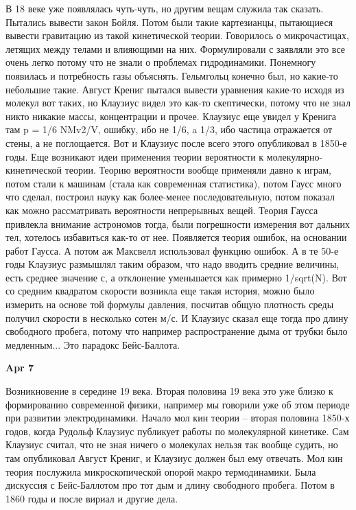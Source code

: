 \documentclass[a4paper, 12pt]{article}
\begin{document}
В 18 веке уже появлялась чуть-чуть, но другим вещам служила так сказать. 
Пытались вывести закон Бойля. Потом были такие картезианцы, пытающиеся 
вывести гравитацию из такой кинетической теории. Говорилось 
о микрочастицах, летящих между телами и влияющими на них. Формулировали 
с заявляли это все очень легко потому что не знали о проблемах 
гидродинамики. Понемногу появилась и потребность газы объяснять. 
Гельмгольц конечно был, но какие-то небольшие такие. Август Крениг 
пытался вывести уравнения какие-то исходя из молекул вот таких, но 
Клаузиус видел это как-то скептически, потому что не знал никто никакие 
массы, концентрации и прочее. Клаузиус еще увидел у Кренига там p = 1/6 
NMv2/V, ошибку, ибо не 1/6, a 1/3, ибо частица отражается от стены, а не 
поглощается. Вот и Клаузиус после всего этого опубликовал в 1850-е годы. 
Еще возникают идеи применения теории вероятности 
к молекулярно-кинетической теории. Теорию вероятности вообще применяли 
давно к играм, потом стали к машинам (стала как современная статистика), 
потом Гаусс много что сделал, построил науку как более-менее 
последовательную, потом показал как можно рассматривать вероятности 
непрерывных вещей. Теория Гаусса привлекла внимание астрономов тогда, 
были погрешности измерения вот дальних тел, хотелось избавиться как-то 
от нее. Появляется теория ошибок, на основании работ Гаусса. А потом аж 
Максвелл использовал функцию ошибок. А в те 50-е годы Клаузиус размышлял 
таким образом, что надо вводить средние величины, есть среднее значение 
с, а отклонение уменьшается как примерно 1/sqrt(N). Вот со средним 
квадратом скорости возникла еще такая история, можно было измерить на 
основе той формулы давления, посчитав общую плотность среды получил 
скорости в несколько сотен м/с. И Клаузиус сказал еще тогда про длину 
свободного пробега, потому что например распространение дыма от трубки 
было медленным... Это парадокс Бейс-Баллота.

\hfill \textbf{Apr 7}

Возникновение в середине 19 века. Вторая половина 19 века это уже близко 
к формированию современной физики, например мы говорили уже об этом 
периоде при развитии электродинамики. Начало мол кин теории -- вторая 
половина 1850-х годов, когда Рудольф Клаузиус публикует работы по 
молекулярной кинетике. Сам Клаузиус считал, что не зная ничего 
о молекулах нельзя так вообще судить, но там опубликовал Август Крениг, 
и Клаузиус должен был ему отвечать. Мол кин теория послужила 
микроскопической опорой макро термодинамики. Была дискуссия 
с Бейс-Баллотом про тот дым и длину свободного пробега. Потом в 1860 
годы и после вириал и другие дела.
\end{document}
